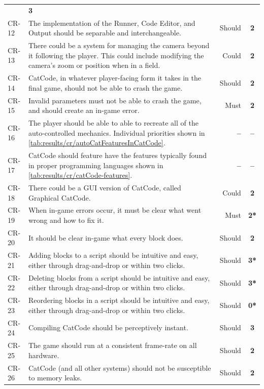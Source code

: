 \begin{center}
\begin{longtable}{lp{9.6cm}rc}
    & \textbf{3}
    \\
    CR-12
    & The implementation of the Runner, Code Editor, and Output should be separable and interchangeable.
    & Should
    & \textbf{2}
    \\
    CR-13
    & There could be a system for managing the camera beyond it following the player. This could include modifying the camera's zoom or position when in a field.
    & Could
    & \textbf{2}
    \\
    CR-14
    & CatCode, in whatever player-facing form it takes in the final game, should not be able to crash the game.
    & Should
    & \textbf{2}
    \\
    CR-15
    & Invalid parameters must not be able to crash the game, and should create an in-game error.
    & Must
    & \textbf{2}
    \\
    CR-16
    & The player should be able to able to recreate all of the auto-controlled mechanics. Individual priorities shown in \autoref{tab:results/cr/autoCatFeaturesInCatCode}.
    & \textbf{--}
    & \textbf{--}
    \\
    CR-17
    & CatCode should feature have the features typically found in proper programming languages shown in \autoref{tab:results/cr/catCode-features}.
    & \textbf{--}
    & \textbf{--}
    \\
    CR-18
    & There could be a GUI version of CatCode, called Graphical CatCode.
    & Could
    & \textbf{2}
    \\
    CR-19
    & When in-game errors occur, it must be clear what went wrong and how to fix it.
    & Must
    & \textbf{2*}
    \\
    CR-20
    & It should be clear in-game what every block does.
    & Should
    & \textbf{2}
    \\
    CR-21
    & Adding blocks to a script should be intuitive and easy, either through drag-and-drop or within two clicks.
    & Should
    & \textbf{3*}
    \\
    CR-22
    & Deleting blocks from a script should be intuitive and easy, either through drag-and-drop or within two clicks.
    & Should
    & \textbf{3*}
    \\
    CR-23
    & Reordering blocks in a script should be intuitive and easy, either through drag-and-drop or within two clicks.
    & Should
    & \textbf{0*}
    \\
    CR-24
    & Compiling CatCode should be perceptively instant.
    & Should
    & \textbf{3}
    \\
    CR-25
    & The game should run at a consistent frame-rate on all hardware.
    & Should
    & \textbf{2}
    \\
    CR-26
    & CatCode (and all other systems) should not be susceptible to memory leaks.
    & Should
    & \textbf{2}
    \\
    \bottomrule
  \end{longtable}
\end{center}

